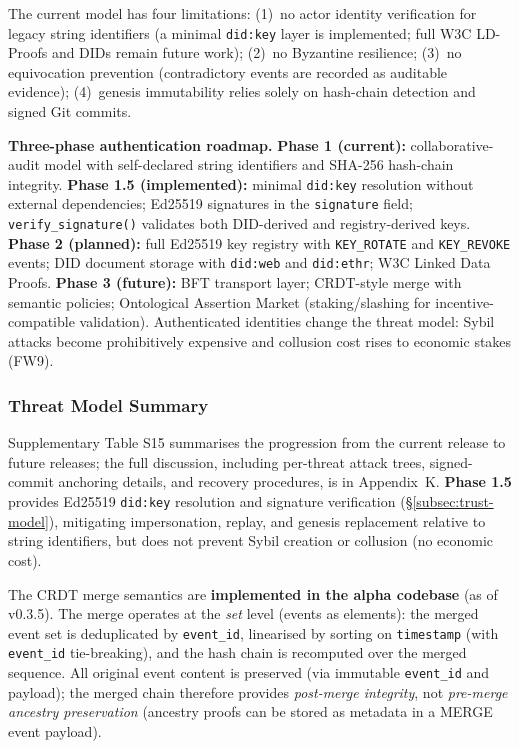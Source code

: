 The current model has four limitations: (1)~no actor identity verification for legacy string identifiers (a minimal \texttt{did:key} layer is implemented; full W3C LD-Proofs and DIDs remain future work); (2)~no Byzantine resilience; (3)~no equivocation prevention (contradictory events are recorded as auditable evidence); (4)~genesis immutability relies solely on hash-chain detection and signed Git commits.

\textbf{Three-phase authentication roadmap.} \textbf{Phase 1 (current):} collaborative-audit model with self-declared string identifiers and SHA-256 hash-chain integrity. \textbf{Phase 1.5 (implemented):} minimal \texttt{did:key} resolution without external dependencies; Ed25519 signatures in the \texttt{signature} field; \texttt{verify\_signature()} validates both DID-derived and registry-derived keys. \textbf{Phase 2 (planned):} full Ed25519 key registry with \texttt{KEY\_ROTATE} and \texttt{KEY\_REVOKE} events; DID document storage with \texttt{did:web} and \texttt{did:ethr}; W3C Linked Data Proofs. \textbf{Phase 3 (future):} BFT transport layer; CRDT-style merge with semantic policies; Ontological Assertion Market (staking/slashing for incentive-compatible validation). Authenticated identities change the threat model: Sybil attacks become prohibitively expensive and collusion cost rises to economic stakes (FW9).

\subsubsection{Threat Model Summary}

Supplementary Table S15 summarises the progression from the current release to future releases; the full discussion, including per-threat attack trees, signed-commit anchoring details, and recovery procedures, is in Appendix~K. \textbf{Phase 1.5} provides Ed25519 \texttt{did:key} resolution and signature verification (\S\ref{subsec:trust-model}), mitigating impersonation, replay, and genesis replacement relative to string identifiers, but does not prevent Sybil creation or collusion (no economic cost).

The CRDT merge semantics are \textbf{implemented in the alpha codebase} (as of v0.3.5). The merge operates at the \emph{set} level (events as elements): the merged event set is deduplicated by \texttt{event\_id}, linearised by sorting on \texttt{timestamp} (with \texttt{event\_id} tie-breaking), and the hash chain is recomputed over the merged sequence. All original event content is preserved (via immutable \texttt{event\_id} and payload); the merged chain therefore provides \emph{post-merge integrity}, not \emph{pre-merge ancestry preservation} (ancestry proofs can be stored as metadata in a \textsc{MERGE} event payload).

